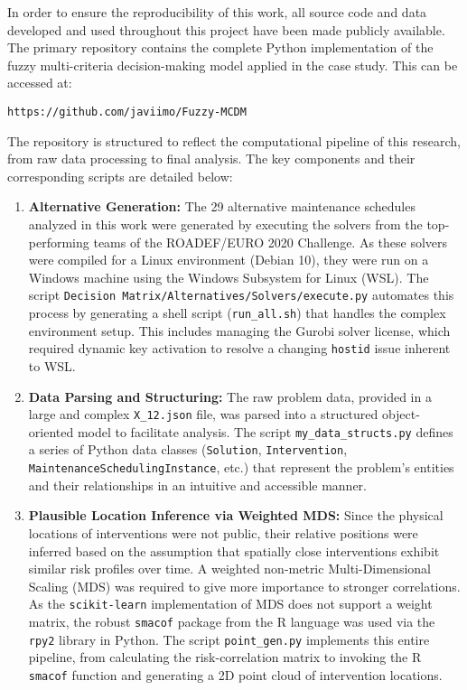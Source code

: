 In order to ensure the reproducibility of this work, all source code and data developed and used throughout this project have been made publicly available. The primary repository contains the complete Python implementation of the fuzzy multi-criteria decision-making model applied in the case study. This can be accessed at:
\begin{center}
    \texttt{https://github.com/javiimo/Fuzzy-MCDM}
\end{center}

The repository is structured to reflect the computational pipeline of this research, from raw data processing to final analysis. The key components and their corresponding scripts are detailed below:

\begin{enumerate}
    \item \textbf{Alternative Generation:} The 29 alternative maintenance schedules analyzed in this work were generated by executing the solvers from the top-performing teams of the ROADEF/EURO 2020 Challenge. As these solvers were compiled for a Linux environment (Debian 10), they were run on a Windows machine using the Windows Subsystem for Linux (WSL). The script \texttt{Decision Matrix/Alternatives/Solvers/execute.py} automates this process by generating a shell script (\texttt{run\_all.sh}) that handles the complex environment setup. This includes managing the Gurobi solver license, which required dynamic key activation to resolve a changing \texttt{hostid} issue inherent to WSL.

    \item \textbf{Data Parsing and Structuring:} The raw problem data, provided in a large and complex \texttt{X\_12.json} file, was parsed into a structured object-oriented model to facilitate analysis. The script \texttt{my\_data\_structs.py} defines a series of Python data classes (\texttt{Solution}, \texttt{Intervention}, \texttt{MaintenanceSchedulingInstance}, etc.) that represent the problem's entities and their relationships in an intuitive and accessible manner.

    \item \textbf{Plausible Location Inference via Weighted MDS:} Since the physical locations of interventions were not public, their relative positions were inferred based on the assumption that spatially close interventions exhibit similar risk profiles over time. A weighted non-metric Multi-Dimensional Scaling (MDS) was required to give more importance to stronger correlations. As the \texttt{scikit-learn} implementation of MDS does not support a weight matrix, the robust \texttt{smacof} package from the R language was used via the \texttt{rpy2} library in Python. The script \texttt{point\_gen.py} implements this entire pipeline, from calculating the risk-correlation matrix to invoking the R \texttt{smacof} function and generating a 2D point cloud of intervention locations.


\end{enumerate}
